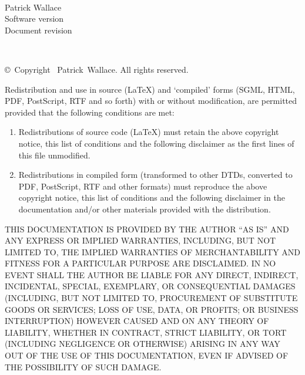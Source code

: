\documentclass[11pt,fleqn,twoside,\paper]{article}
\renewcommand{\_}{{\tt\char'137}}     %
\begin{document}
\thispagestyle{empty}
\begin{center}
\vspace*{10ex}~
\doctitle \\ [10ex]
{\Large Patrick Wallace} \\ [20ex]
Software version \softrev \\
Document revision \docrev \\ [5ex]
\revdate
\end{center}
\newpage
~
\vfill
\begin{center}
\copyright\ Copyright \coprd\ Patrick~Wallace.
All rights reserved.
\end{center}
{\footnotesize
Redistribution and use in source (\LaTeX) and `compiled' forms
(SGML, HTML, PDF, PostScript, RTF and so forth) with or without
modification, are permitted provided that the following conditions
are met:
\begin{enumerate}
\item Redistributions of source code (\LaTeX) must retain the above copyright
      notice, this list of conditions and the following disclaimer as the
      first lines of this file unmodified.
\item Redistributions in compiled form (transformed to other DTDs,
      converted to PDF, PostScript, RTF and other formats) must reproduce
      the above copyright notice, this list of conditions and the
      following disclaimer in the documentation and/or other materials
      provided with the distribution.
\end{enumerate}
}
{\footnotesize
THIS DOCUMENTATION IS PROVIDED BY THE AUTHOR ``AS IS''
AND ANY EXPRESS OR IMPLIED WARRANTIES, INCLUDING, BUT NOT LIMITED TO, THE
IMPLIED WARRANTIES OF MERCHANTABILITY AND FITNESS FOR A PARTICULAR PURPOSE
ARE DISCLAIMED.  IN NO EVENT SHALL THE AUTHOR BE LIABLE FOR ANY DIRECT,
INDIRECT, INCIDENTAL, SPECIAL, EXEMPLARY, OR CONSEQUENTIAL DAMAGES
(INCLUDING, BUT NOT LIMITED TO, PROCUREMENT OF SUBSTITUTE GOODS OR
SERVICES; LOSS OF USE, DATA, OR PROFITS; OR BUSINESS INTERRUPTION)
HOWEVER CAUSED AND ON ANY THEORY OF LIABILITY, WHETHER IN CONTRACT,
STRICT LIABILITY, OR TORT (INCLUDING NEGLIGENCE OR OTHERWISE) ARISING IN
ANY WAY OUT OF THE USE OF THIS DOCUMENTATION, EVEN IF ADVISED OF THE
POSSIBILITY OF SUCH DAMAGE.
}
\newpage


\setlength{\parskip}{0mm}
\tableofcontents
\setlength{\parskip}{\bigskipamount}
\newpage
\end{document}
